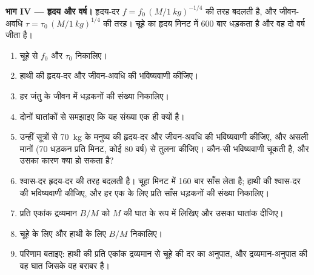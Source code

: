 \begin{problem}
\medskip
\noindent\textbf{भाग IV --- हृदय और वर्ष।}
हृदय-दर $f = f_0\,(M/\qty{1}{kg})^{-1/4}$ की तरह बदलती है, और जीवन-अवधि
$\tau = \tau_0\,(M/\qty{1}{kg})^{1/4}$ की तरह। चूहे का हृदय मिनट में
\qty{600}{} बार धड़कता है और वह दो वर्ष जीता है।
\begin{enumerate}[resume]
  \item चूहे से $f_0$ और $\tau_0$ निकालिए।
  \item हाथी की हृदय-दर और जीवन-अवधि की भविष्यवाणी कीजिए।
  \item हर जंतु के जीवन में धड़कनों की संख्या निकालिए।
  \item दोनों घातांकों से समझाइए कि यह संख्या एक ही क्यों है।
  \item उन्हीं सूत्रों से \qty{70}{kg} के मनुष्य की हृदय-दर और
        जीवन-अवधि की भविष्यवाणी कीजिए, और असली मानों
        (\qty{70}{} धड़कन प्रति मिनट, कोई \qty{80}{} वर्ष) से तुलना
        कीजिए। कौन-सी भविष्यवाणी चूकती है, और उसका कारण क्या हो सकता है?
  \item श्वास-दर हृदय-दर की तरह बदलती है। चूहा मिनट में \qty{160}{} बार
        साँस लेता है; हाथी की श्वास-दर की भविष्यवाणी कीजिए, और हर एक के
        लिए प्रति साँस धड़कनों की संख्या निकालिए।
  \item प्रति एकांक द्रव्यमान  $B/M$ को $M$ की घात के रूप में
        लिखिए और उसका घातांक दीजिए।
  \item चूहे के लिए और हाथी के लिए $B/M$ निकालिए।
  \item परिणाम बताइए: हाथी की प्रति एकांक द्रव्यमान  से चूहे
        की दर का अनुपात, और द्रव्यमान-अनुपात की वह घात जिसके वह बराबर
        है।
\end{enumerate}
\end{problem}
